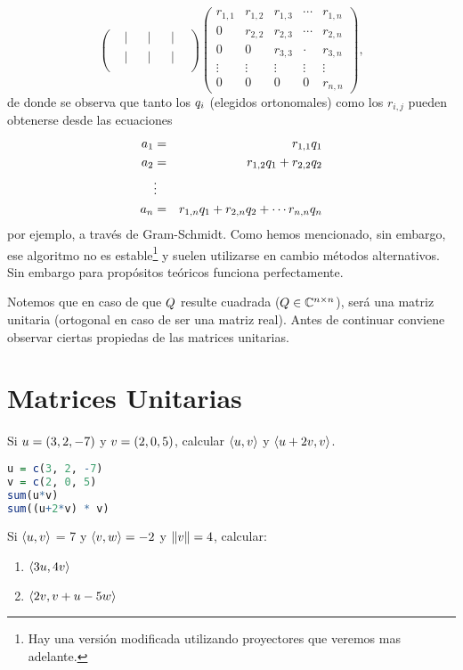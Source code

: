 \begin{tcolorbox}
$$\begin{pmatrix}
&|&&|&&|&\\
&|&&|&&|&\\
\end{pmatrix}
\begin{pmatrix}
 r_{1,1}&r_{1,2}&r_{1,3}&\cdots&r_{1,n}\\
 0&r_{2,2}&r_{2,3}&\cdots&r_{2,n}\\
 0&0&r_{3,3}&\cdot&r_{3,n}\\
 \vdots&\vdots&\vdots&\vdots&\vdots\\
 0&0&0&0&r_{n,n}
\end{pmatrix},
$$
de donde se observa que tanto los $\qb_i$ (elegidos ortonomales) como los $r_{i,j}$ pueden obtenerse desde las ecuaciones
\begin{eqnarray*}
\ab_1&=&r_{1,1}\qb_1\\
\ab_2&=&r_{1,2}\qb_1+r_{2,2}\qb_2\\
&\vdots&\\
\ab_n&=&r_{1,n}\qb_1+r_{2,n}\qb_2+\cdots r_{n,n}\qb_n\\
\end{eqnarray*}
por ejemplo, a través de Gram-Schmidt. Como hemos mencionado, sin embargo, ese algoritmo no es estable\footnote{Hay una versión modificada utilizando proyectores que veremos mas adelante.} y suelen utilizarse en cambio métodos alternativos. Sin embargo para propósitos teóricos funciona perfectamente.

Notemos que en caso de que $\Qb$ resulte cuadrada ($\Qb\in \C^{n\times n}$), será una matriz unitaria (ortogonal en caso de ser una matriz real). Antes de continuar conviene observar ciertas propiedas de las matrices unitarias.

\section{Matrices Unitarias}

\begin{ej}

Si $\ub = (3, 2, -7)$ y $\vb = (2, 0, 5)$, calcular $\langle \ub, \vb\rangle$ y $\langle \ub + 2\vb, \vb\rangle$.

\begin{lstlisting}[language=R]
u = c(3, 2, -7)
v = c(2, 0, 5)
sum(u*v)
sum((u+2*v) * v)
\end{lstlisting}

Si $\langle \ub, \vb \rangle$ = 7 y $\langle \vb, \wb\rangle = -2$ y $\|\vb\| = 4$, calcular:
\begin{enumerate}
\item $\langle 3\ub, 4\vb\rangle$
\item $\langle 2\vb, \vb + \ub - 5\wb\rangle$
\end{enumerate}
\end{ej}




\end{tcolorbox}

